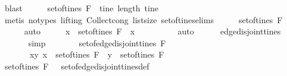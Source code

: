 \begin{isabellebody}
\ blast\isanewline
\ \ \isamarkupfalse%
\ \isamarkupfalse%
\ {\isachardoublequoteopen}set{\isacharunderscore}of{\isacharunderscore}tines\ F\ {\isacharequal}\ {\isacharbraceleft}tine{\isachardot}\ length\ tine\ {\isacharequal}\ {}{\isacharbraceright}{\isachardoublequoteclose}\isanewline
\ \ \ \ \isamarkupfalse%
\ {\isacharparenleft}metis\ {\isacharparenleft}no{\isacharunderscore}types{\isacharcomma}\ lifting{\isacharparenright}\ Collect{\isacharunderscore}cong\ list{\isachardot}size{\isacharparenleft}{}{\isacharparenright}\ set{\isacharunderscore}of{\isacharunderscore}tines{\isachardot}elims{\isacharparenright}\isanewline
\ \ \isamarkupfalse%
\ \isamarkupfalse%
\ {\isachardoublequoteopen}set{\isacharunderscore}of{\isacharunderscore}tines\ F\ {\isacharequal}\ {\isacharbraceleft}{\isacharbrackleft}{\isacharbrackright}{\isacharbraceright}{\isachardoublequoteclose}\isanewline
\ \ \ \ \isamarkupfalse%
\ auto\isanewline
\ \ \isamarkupfalse%
\ \isamarkupfalse%
\ {\isachardoublequoteopen}{\isasymforall}x\ {\isasymin}\ set{\isacharunderscore}of{\isacharunderscore}tines\ F\ {\isachardot}\ x\ {\isacharequal}\ \ {\isacharbrackleft}{\isacharbrackright}\ {\isachardoublequoteclose}\isanewline
\ \ \ \ \isamarkupfalse%
\ auto\isanewline
\ \ \ \ \isamarkupfalse%
\ {\isachardoublequoteopen}edge{\isacharunderscore}disjoint{\isacharunderscore}tines\ {\isacharbrackleft}{\isacharbrackright}\ {\isacharbrackleft}{\isacharbrackright}{\isachardoublequoteclose}\isanewline
\ \ \ \ \ \isamarkupfalse%
\ simp\isanewline
\ \ \ \ \isamarkupfalse%
\ \isamarkupfalse%
\ {\isachardoublequoteopen}set{\isacharunderscore}of{\isacharunderscore}edge{\isacharunderscore}disjoint{\isacharunderscore}tines\ F\ {\isacharequal}\ \isanewline
\ \ \ \ \ \ \ {\isacharbraceleft}{\isacharparenleft}x{\isacharcomma}y{\isacharparenright}{\isachardot}\ x\ {\isasymin}\ set{\isacharunderscore}of{\isacharunderscore}tines\ F\ {\isasymand}\ y\ {\isasymin}\ set{\isacharunderscore}of{\isacharunderscore}tines\ F{\isacharbraceright}{\isachardoublequoteclose}\isanewline
\ \ \ \ \ \isamarkupfalse%
\ {\isacartoucheopen}set{\isacharunderscore}of{\isacharunderscore}tines\ F\ {\isacharequal}\ {\isacharbraceleft}{\isacharbrackleft}{\isacharbrackright}{\isacharbraceright}{\isacartoucheclose}\ set{\isacharunderscore}of{\isacharunderscore}edge{\isacharunderscore}disjoint{\isacharunderscore}tines{\isacharunderscore}def\ \isamarkupfalse%

\end{isabellebody}
